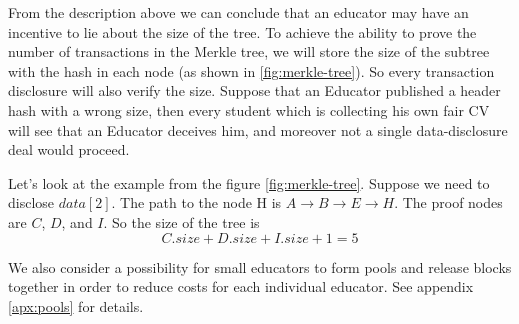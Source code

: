 From the description above we can conclude that an educator may have an incentive to lie about the size of the tree. To achieve the ability to prove the number of transactions in the Merkle tree,
we will store the size of the subtree with the hash in each node (as shown in \ref{fig:merkle-tree}). So every transaction disclosure will also verify the size. Suppose that an Educator published a header hash with a wrong size, then every student which is collecting his own fair CV will see that an Educator deceives him, and moreover not a single data-disclosure deal would proceed.

Let's look at the example from the figure \ref{fig:merkle-tree}. Suppose we need to disclose $data[2]$. The path to the node H is $A \rightarrow B \rightarrow E \rightarrow H$. The proof nodes are $C$, $D$, and $I$. So the size of the tree is $$C.size+D.size+I.size+1=5$$


We also consider a possibility for small educators to form pools and release
blocks together in order to reduce costs for each individual educator. See
appendix \ref{apx:pools} for details.
